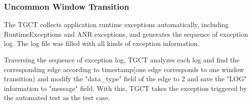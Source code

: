 


\subsubsection{Uncommon Window Transition}
The TGCT collects application runtime exceptions automatically, including RuntimeExceptions and ANR exceptions, and generates the sequence of exception log. The log file was filled with all kinds of exception information.


Traversing the sequence of exception log, TGCT analyzes each log and find the corresponding edge according to timestamp(one edge corresponds to one window transition) and modify the "data\_type" field of the edge to 2 and save the "LOG" information to "message" field. With this, TGCT takes the exception triggered by the automated test as the test case.

